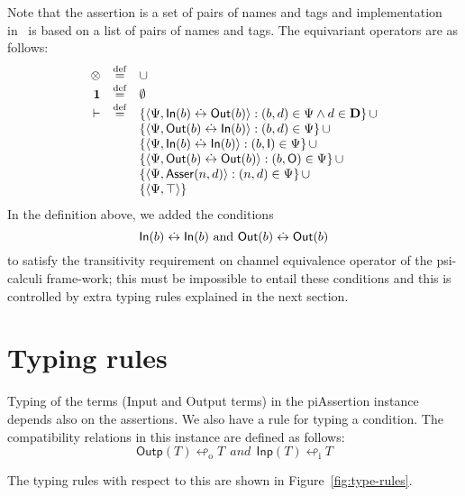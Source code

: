\documentclass[11pt,a4paper]{article}
\theoremstyle{definition}
\begin{document}
Note that the assertion is a set of pairs of names and tags and implementation in~\SML{} is
based on a list of pairs of names and tags.
The equivariant operators are as follows:
\[
\begin{array}{rcl}
{\otimes} & \stackrel{\mathrm{def}}{=} & \cup \\
{\bf 1}   & \stackrel{\mathrm{def}}{=} & \emptyset \\
\vdash  & \stackrel{\mathrm{def}}{=} & \{ \langle \Psi, \mathsf{In}(b) \stackrel{{\hspace{.05ex}\hbox{\ensuremath{\mathbf{.}}}}}{\leftrightarrow} \mathsf{Out}(b) \rangle : (b,d) \in \Psi \land d \in \mathbf{D}\} \, \cup \\
&& \{ \langle \Psi, \mathsf{Out}(b)  \stackrel{{\hspace{.05ex}\hbox{\ensuremath{\mathbf{.}}}}}{\leftrightarrow} \mathsf{In}(b) \rangle : (b,d) \in \Psi  \} \, \cup \\
&& \{ \langle \Psi, \mathsf{In}(b)   \stackrel{{\hspace{.05ex}\hbox{\ensuremath{\mathbf{.}}}}}{\leftrightarrow} \mathsf{In}(b) \rangle : (b,\mathsf{I}) \in \Psi  \} \, \cup \\
&& \{ \langle \Psi, \mathsf{Out}(b)  \stackrel{{\hspace{.05ex}\hbox{\ensuremath{\mathbf{.}}}}}{\leftrightarrow} \mathsf{Out}(b) \rangle : (b,\mathsf{O}) \in \Psi  \} \, \cup \\
&& \{ \langle \Psi, \mathsf{Asser}(n,d) \rangle : (n,d) \in \Psi \} \, \cup \\
&& \{ \langle \Psi, \top \rangle \} 
\end{array}
\]
In the definition above, we added the conditions
\[
\mathsf{In}(b)  \stackrel{{\hspace{.05ex}\hbox{\ensuremath{\mathbf{.}}}}}{\leftrightarrow} \mathsf{In}(b) \text{~and~}
\mathsf{Out}(b)  \stackrel{{\hspace{.05ex}\hbox{\ensuremath{\mathbf{.}}}}}{\leftrightarrow} \mathsf{Out}(b)
\]
to satisfy the transitivity requirement on channel equivalence operator of the
psi-calculi frame-work; this must be impossible to entail these conditions and this
is controlled by extra typing rules explained in the next section. 

\section{Typing rules}
Typing of the terms (Input and Output terms) in the piAssertion instance depends also on
the assertions. We also have a rule for typing a condition.
The compatibility relations in this instance are defined as follows:
\[
\mathsf{Outp}(T) \looparrowleft_{\mathrm{o}} T {~~and~~}\mathsf{Inp}(T) \looparrowleft_{\mathrm{i}} T
\]

The typing rules with respect to this are shown in Figure~\ref{fig:type-rules}.
\end{document}
